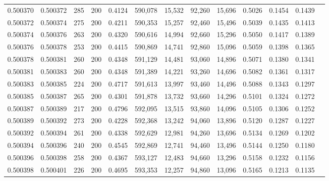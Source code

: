 \begin{tabular}{rrrrrrrrrrrrr}
0.500370 & 0.500372 &    285 & 200 &                                     0.4124 & 590,078 &  15,532 &  92,260 &  15,696 & 0.5026 & 0.1454 & 0.1439 \\
0.500372 & 0.500374 &    275 & 200 &                                     0.4211 & 590,353 &  15,257 &  92,460 &  15,496 & 0.5039 & 0.1435 & 0.1413 \\
0.500374 & 0.500376 &    263 & 200 &                                     0.4320 & 590,616 &  14,994 &  92,660 &  15,296 & 0.5050 & 0.1417 & 0.1389 \\
0.500376 & 0.500378 &    253 & 200 &                                     0.4415 & 590,869 &  14,741 &  92,860 &  15,096 & 0.5059 & 0.1398 & 0.1365 \\
0.500378 & 0.500381 &    260 & 200 &                                     0.4348 & 591,129 &  14,481 &  93,060 &  14,896 & 0.5071 & 0.1380 & 0.1341 \\
0.500381 & 0.500383 &    260 & 200 &                                     0.4348 & 591,389 &  14,221 &  93,260 &  14,696 & 0.5082 & 0.1361 & 0.1317 \\
0.500383 & 0.500385 &    224 & 200 &                                     0.4717 & 591,613 &  13,997 &  93,460 &  14,496 & 0.5088 & 0.1343 & 0.1297 \\
0.500385 & 0.500387 &    265 & 200 &                                     0.4301 & 591,878 &  13,732 &  93,660 &  14,296 & 0.5101 & 0.1324 & 0.1272 \\
0.500387 & 0.500389 &    217 & 200 &                                     0.4796 & 592,095 &  13,515 &  93,860 &  14,096 & 0.5105 & 0.1306 & 0.1252 \\
0.500389 & 0.500392 &    273 & 200 &                                     0.4228 & 592,368 &  13,242 &  94,060 &  13,896 & 0.5120 & 0.1287 & 0.1227 \\
0.500392 & 0.500394 &    261 & 200 &                                     0.4338 & 592,629 &  12,981 &  94,260 &  13,696 & 0.5134 & 0.1269 & 0.1202 \\
0.500394 & 0.500396 &    240 & 200 &                                     0.4545 & 592,869 &  12,741 &  94,460 &  13,496 & 0.5144 & 0.1250 & 0.1180 \\
0.500396 & 0.500398 &    258 & 200 &                                     0.4367 & 593,127 &  12,483 &  94,660 &  13,296 & 0.5158 & 0.1232 & 0.1156 \\
0.500398 & 0.500401 &    226 & 200 &                                     0.4695 & 593,353 &  12,257 &  94,860 &  13,096 & 0.5165 & 0.1213 & 0.1135 \\

\end{tabular}
